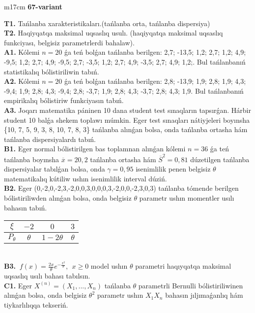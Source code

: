 \documentclass{article}
\begin{document}
\begin{tabular}{m{17cm}}
\textbf{67-variant}
\newline

\textbf{T1.} 
Tańlanba xarakteristikaları.(tańlanba orta, tańlanba dispersiya)
 \\
\textbf{T2.} 
Haqiyqatqa maksimal uqsaslıq usulı. (haqiyqatqa maksimal uqsaslıq funkciyası, belgisiz parametrlerdi bahalaw).
 \\
\textbf{A1.} 
Kólemi \(n = 20\) ǵa teń bolǵan tańlanba berilgen: 2,7; -13,5; 1,2; 2,7; 1,2; 4,9; -9,5; 1,2; 2,7; 4,9; -9,5; 2,7; -3,5; 1,2; 2,7; 4,9; -3,5; 2,7; 4,9; 1,2;. Bul tańlanbanıń statistikalıq bólistiriliwin tabıń.
 \\
\textbf{A2.} 
Kólemi \(n = 20\) ǵa teń bolǵan tańlanba berilgen: 2,8; -13,9; 1,9; 2,8; 1,9; 4,3; -9,4; 1,9; 2,8; 4,3; -9,4; 2,8; -3,7; 1,9; 2,8; 4,3; -3,7; 2,8; 4,3; 1,9. Bul tańlanbanıń empirikalıq bólistiriw funkciyasın tabıń.
 \\
\textbf{A3.} 
Joqarı matematika páninen 10 dana student test sınaqların tapsırǵan. Hárbir student 10 balǵa shekem toplawı múmkin. Eger test sınaqları nátiyjeleri boyınsha \{10, 7, 5, 9, 3, 8, 10, 7, 8, 3\} tańlanba alınǵan bolsa, onda tańlanba ortasha hám tańlanba dispersiyalardı tabıń.
 \\
\textbf{B1.} 
Eger normal bólistirilgen bas toplamnan alınǵan kólemi \(n = 36\) ǵa teń tańlanba boyınsha \(\overline{x} = 20,2\) tańlanba ortasha hám \({\overline{S}}^{2} = 0,81\) dúzetilgen tańlanba dispersiyalar tabılǵan bolsa, onda \(\gamma = 0,95\) isenimlilik penen belgisiz \(\theta\) matematikalıq kútiliw ushın isenimlilik interval dúziń.
 \\
\textbf{B2.} 
Eger (0,-2,0,-2,3,-2,0,0,3,0,0,0,3,-2,0,0,-2,3,0,3) tańlanba tómende berilgen bólistiriliwden alınǵan bolsa, onda belgisiz \(\theta\) parametr ushın momentler usılı bahasın tabıń.
\begin{tabular}{|c|c|c|c|}
  \hline
$\xi$ & $- 2$  & $0$  & $3$ \\
\hline
\(P_{\theta}\) & \(\theta\) & \(1 - 2\theta\) & \(\theta\) \\
\hline
\end{tabular}
 \\
\textbf{B3.} 
\(\ f(x) = \frac{2x}{\theta}e^{- \frac{x^{2}}{\theta}},\ \ x \geq 0\) model ushın \(\theta\) parametri haqıyqatqa maksimal uqsaslıq usılı bahası tabılsın.
 \\
\textbf{C1.} 
Eger \(X^{(n)} = \left( X_{1},...,X_{n} \right)\) tańlanba \(\theta\) parametrli Bernulli bólistiriliwinen alınǵan bolsa, onda belgisiz \(\theta^{2}\) parametr ushın \(X_{1}X_{n}\) bahasın jıljımaǵanlıq hám tiykarlılıqqa tekseriń.

\end{tabular}
\end{document}
